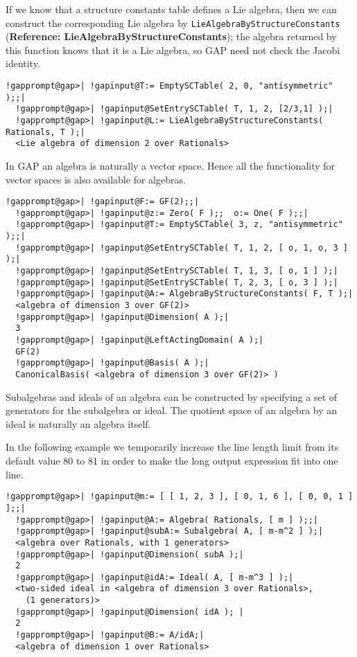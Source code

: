 \documentclass[a4paper,11pt]{report}
\begin{document}
{{ If we know that a structure constants table defines a Lie algebra, then we can
construct the corresponding Lie algebra by \texttt{LieAlgebraByStructureConstants} (\textbf{Reference: LieAlgebraByStructureConstants}); the algebra returned by this function knows that it is a Lie algebra, so \textsf{GAP} need not check the Jacobi identity. 

 
\begin{Verbatim}[commandchars=!@|,fontsize=\small,frame=single,label=Example]
  !gapprompt@gap>| !gapinput@T:= EmptySCTable( 2, 0, "antisymmetric" );;|
  !gapprompt@gap>| !gapinput@SetEntrySCTable( T, 1, 2, [2/3,1] );|
  !gapprompt@gap>| !gapinput@L:= LieAlgebraByStructureConstants( Rationals, T );|
  <Lie algebra of dimension 2 over Rationals>
\end{Verbatim}
 

 In \textsf{GAP} an algebra is naturally a vector space. Hence all the functionality for vector
spaces is also available for algebras. 

 
\begin{Verbatim}[commandchars=!@|,fontsize=\small,frame=single,label=Example]
  !gapprompt@gap>| !gapinput@F:= GF(2);;|
  !gapprompt@gap>| !gapinput@z:= Zero( F );;  o:= One( F );;|
  !gapprompt@gap>| !gapinput@T:= EmptySCTable( 3, z, "antisymmetric" );;|
  !gapprompt@gap>| !gapinput@SetEntrySCTable( T, 1, 2, [ o, 1, o, 3 ] );|
  !gapprompt@gap>| !gapinput@SetEntrySCTable( T, 1, 3, [ o, 1 ] );|
  !gapprompt@gap>| !gapinput@SetEntrySCTable( T, 2, 3, [ o, 3 ] );|
  !gapprompt@gap>| !gapinput@A:= AlgebraByStructureConstants( F, T );|
  <algebra of dimension 3 over GF(2)>
  !gapprompt@gap>| !gapinput@Dimension( A );|
  3
  !gapprompt@gap>| !gapinput@LeftActingDomain( A );|
  GF(2)
  !gapprompt@gap>| !gapinput@Basis( A );|
  CanonicalBasis( <algebra of dimension 3 over GF(2)> )
\end{Verbatim}
 

 Subalgebras and ideals of an algebra can be constructed by specifying a set of
generators for the subalgebra or ideal. The quotient space of an algebra by an
ideal is naturally an algebra itself. 

 In the following example we temporarily increase the line length limit from
its default value 80 to 81 in order to make the long output expression fit
into one line. 

 
\begin{Verbatim}[commandchars=!@|,fontsize=\small,frame=single,label=Example]
  !gapprompt@gap>| !gapinput@m:= [ [ 1, 2, 3 ], [ 0, 1, 6 ], [ 0, 0, 1 ] ];;|
  !gapprompt@gap>| !gapinput@A:= Algebra( Rationals, [ m ] );;|
  !gapprompt@gap>| !gapinput@subA:= Subalgebra( A, [ m-m^2 ] );|
  <algebra over Rationals, with 1 generators>
  !gapprompt@gap>| !gapinput@Dimension( subA );|
  2
  !gapprompt@gap>| !gapinput@idA:= Ideal( A, [ m-m^3 ] );|
  <two-sided ideal in <algebra of dimension 3 over Rationals>, 
    (1 generators)>
  !gapprompt@gap>| !gapinput@Dimension( idA ); |
  2
  !gapprompt@gap>| !gapinput@B:= A/idA;|
  <algebra of dimension 1 over Rationals>
\end{Verbatim}
 

}}
\end{document}
